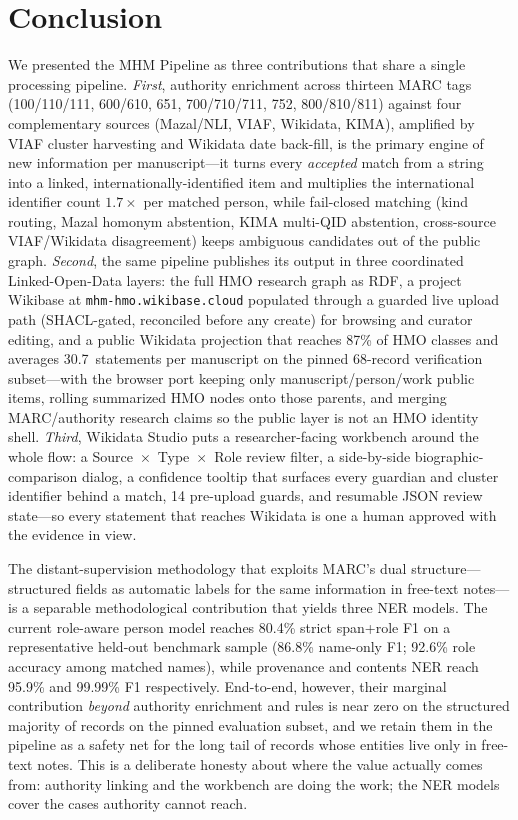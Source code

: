 \documentclass[Afour,sageh,times]{sagej}
\begin{document}
\section{Conclusion}
\label{sec:conclusion}

We presented the MHM Pipeline as three contributions that share a single processing pipeline. \emph{First}, authority enrichment across thirteen MARC tags (100/110/111, 600/610, 651, 700/710/711, 752, 800/810/811) against four complementary sources (Mazal/NLI, VIAF, Wikidata, KIMA), amplified by VIAF cluster harvesting and Wikidata date back-fill, is the primary engine of new information per manuscript---it turns every \emph{accepted} match from a string into a linked, internationally-identified item and multiplies the international identifier count $1.7\times$ per matched person, while fail-closed matching (kind routing, Mazal homonym abstention, KIMA multi-QID abstention, cross-source VIAF/Wikidata disagreement) keeps ambiguous candidates out of the public graph. \emph{Second}, the same pipeline publishes its output in three coordinated Linked-Open-Data layers: the full HMO research graph as RDF, a project Wikibase at \texttt{mhm-hmo.wikibase.cloud} populated through a guarded live upload path (SHACL-gated, reconciled before any create) for browsing and curator editing, and a public Wikidata projection that reaches 87\% of HMO classes and averages 30.7~statements per manuscript on the pinned 68-record verification subset---with the browser port keeping only manuscript/person/work public items, rolling summarized HMO nodes onto those parents, and merging MARC/authority research claims so the public layer is not an HMO identity shell. \emph{Third}, Wikidata Studio puts a researcher-facing workbench around the whole flow: a Source~$\times$~Type~$\times$~Role review filter, a side-by-side biographic-comparison dialog, a confidence tooltip that surfaces every guardian and cluster identifier behind a match, 14 pre-upload guards, and resumable JSON review state---so every statement that reaches Wikidata is one a human approved with the evidence in view.

The distant-supervision methodology that exploits MARC's dual structure---structured fields as automatic labels for the same information in free-text notes---is a separable methodological contribution that yields three NER models. The current role-aware person model reaches 80.4\% strict span+role F1 on a representative held-out benchmark sample (86.8\% name-only F1; 92.6\% role accuracy among matched names), while provenance and contents NER reach 95.9\% and 99.99\% F1 respectively. End-to-end, however, their marginal contribution \emph{beyond} authority enrichment and rules is near zero on the structured majority of records on the pinned evaluation subset, and we retain them in the pipeline as a safety net for the long tail of records whose entities live only in free-text notes. This is a deliberate honesty about where the value actually comes from: authority linking and the workbench are doing the work; the NER models cover the cases authority cannot reach.
\end{document}
